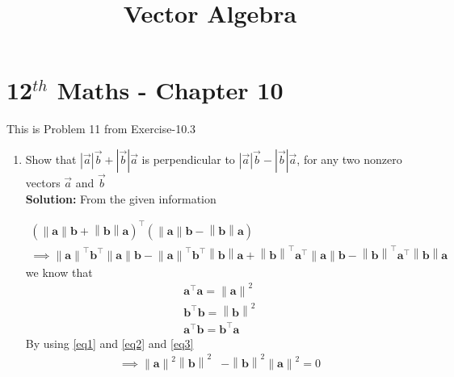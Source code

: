 \documentclass[10pt]{article}
\providecommand{\brak}[1]{\ensuremath{\left(#1\right)}}
\newcommand{\solution}{\noindent \textbf{Solution: }}
\providecommand{\norm}[1]{\left\lVert#1\right\rVert}
\providecommand{\abs}[1]{\left\vert#1\right\vert}
\let\vec\mathbf{}
\begin{document}
\begin{center}
\title{\textbf{Vector Algebra}}
\date{\vspace{-5ex}} %
\maketitle
\end{center}

\section{12$^{th}$ Maths - Chapter 10}
This is Problem 11 from Exercise-10.3
\begin{enumerate}
\item Show that $\abs{\overrightarrow{a}}\overrightarrow{b}+\abs{\overrightarrow{b}}\overrightarrow{a}$ is perpendicular to $\abs{\overrightarrow{a}}\overrightarrow{b}-\abs{\overrightarrow{b}}\overrightarrow{a}$, for any two nonzero vectors $\overrightarrow{a}$ and $\overrightarrow{b}$\\  

\solution
From the given information

\begin{align}
	\brak{\norm{\vec{a}}\vec{b}+\norm{\vec{b}}\vec{a}}^\top\brak{\norm{\vec{a}}\vec{b}-	\norm{\vec{b}}\vec{a}}\\
	\implies \norm{\vec{a}}^\top\vec{b}^\top\norm{\vec{a}}\vec{b}-\norm{\vec{a}}^\top\vec{b}^\top\norm{\vec{b}}\vec{a}+\norm{\vec{b}}^\top\vec{a}^\top\norm{\vec{a}}\vec{b}-\norm{\vec{b}}^\top\vec{a}^\top\norm{\vec{b}}\vec{a}
\end{align}
we know that
\begin{align}
    \vec{a}^{\top}\vec{a} = \norm{\vec{a}}^2
    \label{eq1}  \\
    \vec{b}^{\top}\vec{b} = \norm{\vec{b}}^2
    \label{eq2}  \\
    \vec{a}^{\top}\vec{b} = \vec{b}^{\top}\vec{a}
    \label{eq3}
\end{align}
By using \eqref{eq1} and \eqref{eq2} and \eqref{eq3}
\begin{align}
	\implies\norm{\vec{a}}^2\norm{\vec{b}}^2&-\norm{\vec{b}}^2\norm{\vec{a}}^2=0
\end{align}
\end{enumerate}
\end{document}
